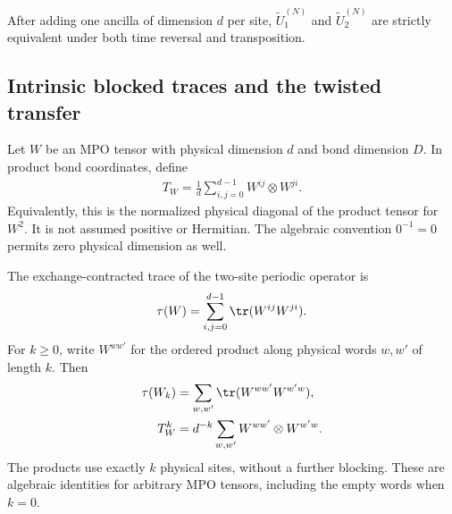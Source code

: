 \begin{lemma}
    \label{prop:U1-U2-equiv-ancillatrick}
    \notready
    After adding one ancilla of dimension $d$ per site,
    $\widetilde U_1^{(N)}$ and $\widetilde U_2^{(N)}$ are strictly equivalent
    under both time reversal and transposition.
\end{lemma}

\subsection{Intrinsic blocked traces and the twisted transfer}

\begin{definition}
    \label{def:mpu_time_reversal_twisted_transfer}
    \leanok
    Let $W$ be an MPO tensor with physical dimension $d$ and bond dimension
    $D$. In product bond coordinates, define
    \begin{align}
        T_W=\frac{1}{d}\sum_{i,j=0}^{d-1}W^{ij}\otimes W^{ji}.
    \end{align}
    Equivalently, this is the normalized physical diagonal of the product
    tensor for $W^2$. It is not assumed positive or Hermitian. The algebraic
    convention $0^{-1}=0$ permits zero physical dimension as well.
\end{definition}

\begin{lemma}
    \label{lem:mpu_time_reversal_blocked_open_words}
    \leanok
    The exchange-contracted trace of the two-site periodic operator is
    \begin{align}
        \tau(W)=\sum_{i,j=0}^{d-1}\tr(W^{ij}W^{ji}).
    \end{align}
    For $k\geq0$, write $W^{ww'}$ for the ordered product along
    physical words $w,w'$ of length $k$. Then
    \begin{align}
        \tau(W_k)
         & =\sum_{w,w'}\tr(W^{ww'}W^{w'w}), \\
        T_W^k
         & =d^{-k}\sum_{w,w'}
        W^{ww'}\otimes W^{w'w}.
    \end{align}
    The products use exactly $k$ physical sites, without a further blocking.
    These are algebraic identities for arbitrary MPO tensors, including the
    empty words when $k=0$.
\end{lemma}


